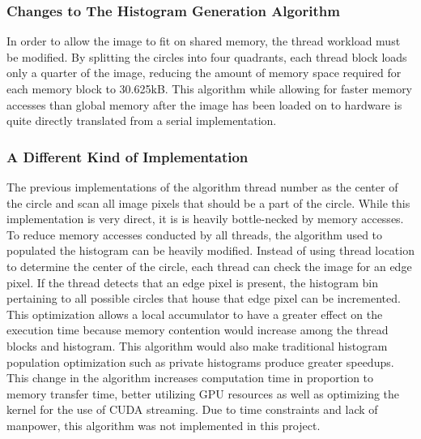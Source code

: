\documentclass[conference]{IEEEtran}
\begin{document}
\subsubsection*{Changes to The Histogram Generation Algorithm}
In order to allow the image to fit on shared memory, the thread workload must be modified.
By splitting the circles into four quadrants, each thread block loads only a quarter of the image, reducing the amount of memory space required for each memory block to 30.625kB. 
This algorithm while allowing for faster memory accesses than global memory after the image has been loaded on to hardware is quite directly translated from a serial implementation.


\subsubsection*{A Different Kind of Implementation}
The previous implementations of the algorithm thread number as the center of the circle and scan all image pixels that should be a part of the circle.
While this implementation is very direct, it is is heavily bottle-necked by memory accesses. 
To reduce memory accesses conducted by all threads, the algorithm used to populated the histogram can be heavily modified.
Instead of using thread location to determine the center of the circle, each thread can check the image for an edge pixel. 
If the thread detects that an edge pixel is present, the histogram bin pertaining to all possible circles that house that edge pixel can be incremented.
This optimization allows a local accumulator to have a greater effect on the execution time because memory contention would increase among the thread blocks and histogram. 
This algorithm would also make traditional histogram population optimization such as private histograms produce greater speedups.
This change in the algorithm increases computation time in proportion to memory transfer time, better utilizing GPU resources as well as optimizing the kernel for the use of CUDA streaming.
Due to time constraints and lack of manpower, this algorithm was not implemented in this project.
\end{document}
